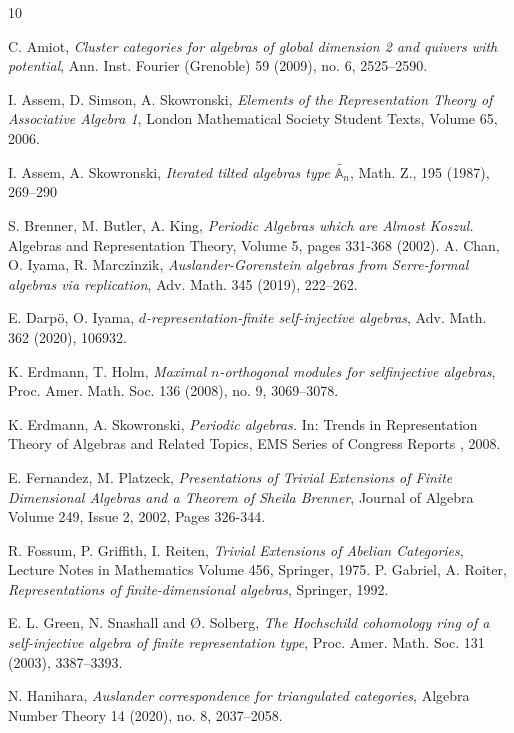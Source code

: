 \documentclass[a4paper,reqno,11pt]{amsart}
\theoremstyle{definition}
\newcommand{\new}[1]{{\blue #1}}
\numberwithin{equation}{section}
\begin{document}
\begin{thebibliography}{10}

 C. Amiot, \emph{Cluster categories for algebras of global dimension 2 and quivers with potential}, Ann. Inst. Fourier (Grenoble) 59 (2009), no. 6, 2525--2590.

 I. Assem, D. Simson, A. Skowronski,  {\it Elements of the Representation Theory of Associative Algebra 1}, London Mathematical Society Student Texts, Volume 65, 2006. 

 I. Assem, A. Skowronski, {\it Iterated tilted algebras type $\widetilde{\mathbb{A}_n}$}, Math. Z., 195 (1987), 269--290

 S. Brenner, M. Butler, A. King, {\it Periodic Algebras which are Almost Koszul.} Algebras and Representation Theory, Volume 5, pages 331-368 (2002).
 A. Chan, O. Iyama, R. Marczinzik, \emph{Auslander-Gorenstein algebras from Serre-formal algebras via replication}, Adv. Math. 345 (2019), 222--262.

 E. Darp\"o, O. Iyama, \emph{$d$-representation-finite self-injective algebras}, Adv. Math. 362 (2020), 106932.

 K. Erdmann, T. Holm, \emph{Maximal $n$-orthogonal modules for selfinjective algebras}, Proc. Amer. Math. Soc. 136 (2008), no. 9, 3069--3078.

 K. Erdmann, A. Skowronski, {\it Periodic algebras.} In: Trends in Representation Theory of Algebras and Related Topics, EMS Series of Congress Reports , 2008.

 E. Fernandez, M. Platzeck, {\it Presentations of Trivial Extensions of Finite Dimensional Algebras and a Theorem of Sheila Brenner}, Journal of Algebra Volume 249, Issue 2, 2002, Pages 326-344.

 R. Fossum, P. Griffith, I. Reiten, {\it Trivial Extensions of Abelian Categories}, Lecture Notes in Mathematics Volume 456, Springer, 1975.
 P. Gabriel, A. Roiter, {\it Representations of finite-dimensional algebras}, Springer, 1992.

 E. L. Green, N. Snashall and {\O}. Solberg, \emph{The Hochschild cohomology ring of a self-injective algebra of finite representation type}, Proc. Amer. Math. Soc. 131 (2003), 3387–3393.

 N. Hanihara, \emph{Auslander correspondence for triangulated categories}, \new{Algebra Number Theory 14 (2020), no. 8, 2037--2058.}


\end{thebibliography}
\end{document}
